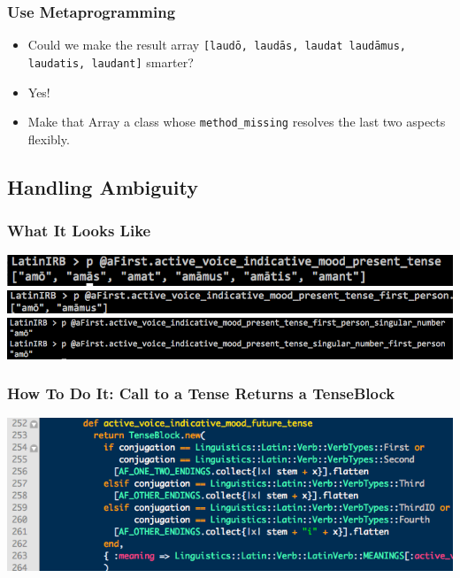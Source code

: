 \documentclass[slidestop,compress,mathserif,notes]{beamer}
\begin{document}
\begin{frame}
	\frametitle{ Use Metaprogramming}
	\begin{itemize}
		\item Could we make the result array \texttt{[laud\={o}, laud\={a}s, laudat laud\={a}mus, laudatis, laudant]} smarter?
		\pause
		\item Yes!
		\pause 
		\item Make that Array a class whose \texttt{method\_missing} resolves the last two aspects flexibly.
	\end{itemize}
\end{frame}


\subsection{Handling Ambiguity} %
\label{sub:methods}

\begin{frame}
	\frametitle{What It Looks Like}

	\includegraphics[scale=0.35]{img/flexibility_1.png}	
	\vskip 0.5cm
	\includegraphics[scale=0.35]{img/flexibility_2.png}	
	\vskip 0.5cm
	\includegraphics[scale=0.30]{img/flexibility_3.png}	
\end{frame}

\begin{frame}
	\frametitle{How To Do It:  Call to a Tense Returns a TenseBlock}
	\begin{center}
		\includegraphics[scale=0.45]{img/tense_method_call.png}
	\end{center}
\end{frame}
\end{document}
